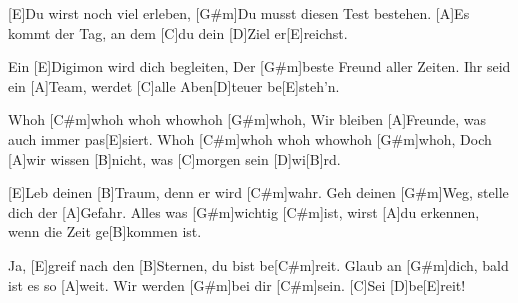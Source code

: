 

\begin{guitar}
	[E]Du wirst noch viel erleben,
	[G#m]Du musst diesen Test bestehen.
	[A]Es kommt der Tag, an dem [C]du dein [D]Ziel er[E]reichst.
	
	Ein [E]Digimon wird dich begleiten,
	Der [G#m]beste Freund aller Zeiten.
	Ihr seid ein [A]Team, werdet [C]alle Aben[D]teuer be[E]steh'n.
	
	Whoh [C#m]whoh whoh whowhoh [G#m]whoh,
	Wir bleiben [A]Freunde, was auch immer pas[E]siert.
	Whoh [C#m]whoh whoh whowhoh [G#m]whoh,
	Doch [A]wir wissen [B]nicht, was [C]morgen sein [D]wi[B]rd.
	
	\begin{highlightbar}
		[E]Leb deinen [B]Traum, denn er wird [C#m]wahr.
		Geh deinen [G#m]Weg, stelle dich der [A]Gefahr.
		Alles was [G#m]wichtig [C#m]ist,
		wirst [A]du erkennen, wenn die Zeit ge[B]kommen ist.
		
		Ja, [E]greif nach den [B]Sternen, du bist be[C#m]reit.
		Glaub an [G#m]dich, bald ist es so [A]weit.
		Wir werden [G#m]bei dir [C#m]sein.
		[C]Sei [D]be[E]reit!
	\end{highlightbar}
\end{guitar}